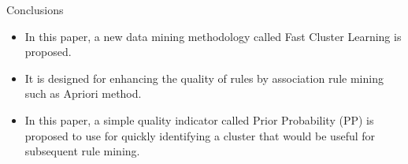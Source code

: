 \documentclass{beamer}
\begin{document}
\begin{frame}{Conclusions}
    
    \begin{itemize}
        \item In this paper, a new data mining methodology called Fast 
Cluster Learning is proposed.
\item It is designed for enhancing the quality of rules by association rule mining such as Apriori method.
\item In this paper, a simple quality indicator called Prior Probability (PP) 
is proposed to use for quickly identifying a cluster that would 
be useful for subsequent rule mining. 
    \end{itemize}
\end{frame}
\end{document}
